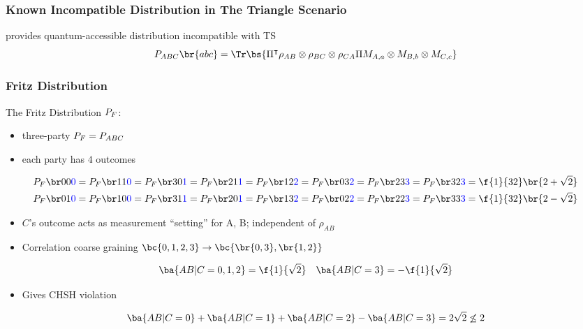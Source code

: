\documentclass[
    hyperref={bookmarks=false},%
    xcolor={dvipsnames},
]{beamer}
\renewcommand{\term}[1]{\textcolor{Mahogany}{#1}}
\begin{document}
\begin{frame}
    \frametitle{Known Incompatible Distribution in The Triangle Scenario}
    \cite{Fritz_2012} provides quantum-accessible distribution incompatible with TS
    \[ \prob[ABC]\br{abc} = \Tr\bs{\netperm^\intercal \rho_{AB}\otimes\rho_{BC}\otimes\rho_{CA} \netperm M_{A,a}\otimes M_{B,b} \otimes M_{C,c}} \]
    \begin{center}
        \scalebox{1.0}{}
    \end{center}
\end{frame}

\begin{frame}
    \frametitle{Fritz Distribution}
    The \term{Fritz Distribution $\prob[F]$}:
    \begin{itemize}
        \item three-party $\prob[F] = \prob[ABC]$
        \item each party has $4$ outcomes
    \end{itemize}
    \begin{gather*}
    \prob[F][00\textcolor{blue}{0}] = \prob[F][11\textcolor{blue}{0}] = \prob[F][30\textcolor{blue}{1}] = \prob[F][21\textcolor{blue}{1}] = \prob[F][12\textcolor{blue}{2}] = \prob[F][03\textcolor{blue}{2}] = \prob[F][23\textcolor{blue}{3}] = \prob[F][32\textcolor{blue}{3}] = \f{1}{32}\br{2 + \sqrt{2}} \\
    \prob[F][01\textcolor{blue}{0}] = \prob[F][10\textcolor{blue}{0}] = \prob[F][31\textcolor{blue}{1}] = \prob[F][20\textcolor{blue}{1}] = \prob[F][13\textcolor{blue}{2}] = \prob[F][02\textcolor{blue}{2}] = \prob[F][22\textcolor{blue}{3}] = \prob[F][33\textcolor{blue}{3}] = \f{1}{32}\br{2 - \sqrt{2}}
    \end{gather*}
    \begin{itemize}
        \item $C$'s outcome acts as measurement ``setting'' for A, B; independent of $\rho_{AB}$
        \item Correlation coarse graining $\bc{0,1,2,3} \to \bc{\br{0,3}, \br{1,2}}$
    \end{itemize}
    \[ \ba{AB | C = 0, 1, 2} = \f{1}{\sqrt{2}} \quad \ba{AB | C = 3} = - \f{1}{\sqrt{2}} \]
    \begin{itemize}
        \item Gives CHSH violation
    \end{itemize}
    \[ \ba{AB|C=0} + \ba{AB|C=1} + \ba{AB|C=2} - \ba{AB|C=3} = 2\sqrt{2} \not \leq 2 \]
\end{frame}
\end{document}
